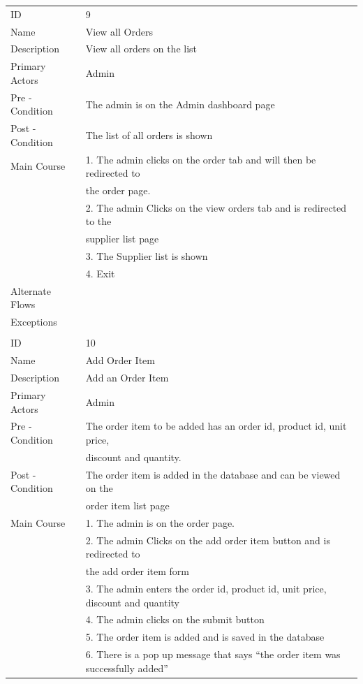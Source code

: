 \documentclass{report}
\begin{document}
\begin{tabular}{ l l }
ID 					& 9 \\
Name 				& View all Orders \\
Description 			& View all orders on the list \\ 
Primary Actors 		& Admin \\
Pre - Condition 		& The admin is on the Admin dashboard page \\ 
Post - Condition 	& The list of all orders is shown \\ 
Main Course			& 1. The admin clicks on the order tab and will then be redirected to \\ 
					& \quad \thinspace the  order page. \\
					& 2. The admin Clicks on the view orders tab and is redirected to the \\ 
					& \quad \thinspace supplier list page \\
					& 3. The Supplier list is shown \\
					& 4. Exit \\
Alternate Flows		& \\
Exceptions 			& \\ \\
ID 					& 10 \\
Name 				& Add Order Item \\
Description 			& Add an Order Item\\ 
Primary Actors 		& Admin \\
Pre - Condition 		& The order item to be added has an order id, product id, unit price, \\ 
					& discount and quantity. \\ 
Post - Condition 	& The order item is added in the database and can be viewed on the \\
					& order item list page \\ 
Main Course			& 1. The admin is on the order page. \\
					& 2. The admin Clicks on the add order item button and is redirected to \\ 
					& \quad \thinspace the add order item form \\
					& 3. The admin enters the order id, product id, unit price, discount and quantity \\
					& 4. The admin clicks on the submit button \\
					& 5. The order item is added and is saved in the database \\
					& 6. There is a pop up message that says “the order item was successfully added” \\

\end{tabular}
\end{document}
